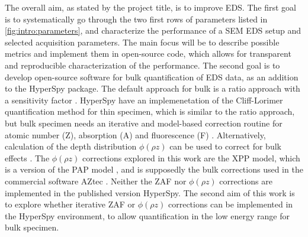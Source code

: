 The overall aim, as stated by the project title, is to improve EDS.
The first goal is to systematically go through the two first rows of parameters listed in \cref{fig:intro:parameters}, and characterize the performance of a SEM EDS setup and selected acquisition parameters.
The main focus will be to describe possible metrics and implement them in open-source code, which allows for transparent and reproducible characterization of the performance.
The second goal is to develop open-source software for bulk quantification of EDS data, as an addition to the HyperSpy package.
The default approach for bulk is a ratio approach with a sensitivity factor \cite{goldstein_scanning_2018}.
HyperSpy have an implemenetation of the Cliff-Lorimer quantification method for thin specimen, which is similar to the ratio approach, but bulk specimen needs an iterative and model-based correction routine for atomic number (Z), absorption (A) and fluorescence (F) \cite{goldstein_scanning_2018}.
Alternatively, calculation of the depth distribution $\phi (\rho z)$ can be used to correct for bulk effects \cite{goldstein_scanning_2018,pap_1991}.
The $\phi (\rho z)$ corrections explored in this work are the XPP model, which is a version of the PAP model \cite{pap_1991}, and is supposedly the bulk corrections used in the commercial software AZtec \cite{oxford_blog_XPP,aztec_manual}.
Neither the ZAF nor $\phi (\rho z)$ corrections are implemented in the published version HyperSpy.
The second aim of this work is to explore whether iterative ZAF or $\phi (\rho z)$ corrections can be implemented in the HyperSpy environment, to allow quantification in the low energy range for bulk specimen.












